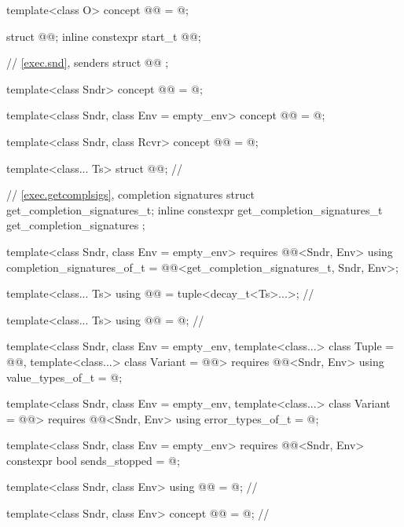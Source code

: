 \begin{codeblock}
{  template<class O>
    concept @@ = @\seebelow@;

  struct @@;
  inline constexpr start_t @@{};

  // \ref{exec.snd}, senders
  struct @@ {};

  template<class Sndr>
    concept @@ = @\seebelow@;

  template<class Sndr, class Env = empty_env>
    concept @@ = @\seebelow@;

  template<class Sndr, class Rcvr>
    concept @@ = @\seebelow@;

  template<class... Ts>
    struct @@;                                           // \expos

  // \ref{exec.getcomplsigs}, completion signatures
  struct get_completion_signatures_t;
  inline constexpr get_completion_signatures_t get_completion_signatures {};

  template<class Sndr, class Env = empty_env>
      requires @@<Sndr, Env>
    using completion_signatures_of_t = @@<get_completion_signatures_t, Sndr, Env>;

  template<class... Ts>
    using @@ = tuple<decay_t<Ts>...>;                // \expos

  template<class... Ts>
    using @@ = @\seebelownc@;                         // \expos

  template<class Sndr, class Env = empty_env,
           template<class...> class Tuple = @@,
           template<class...> class Variant = @@>
      requires @@<Sndr, Env>
    using value_types_of_t = @\seebelow@;

  template<class Sndr, class Env = empty_env,
           template<class...> class Variant = @@>
      requires @@<Sndr, Env>
    using error_types_of_t = @\seebelow@;

  template<class Sndr, class Env = empty_env>
      requires @@<Sndr, Env>
    constexpr bool sends_stopped = @\seebelow@;

  template<class Sndr, class Env>
    using @@ = @\seebelownc@;                 // \expos

  template<class Sndr, class Env>
    concept @@ = @\seebelow@; // \expos

}
\end{codeblock}
